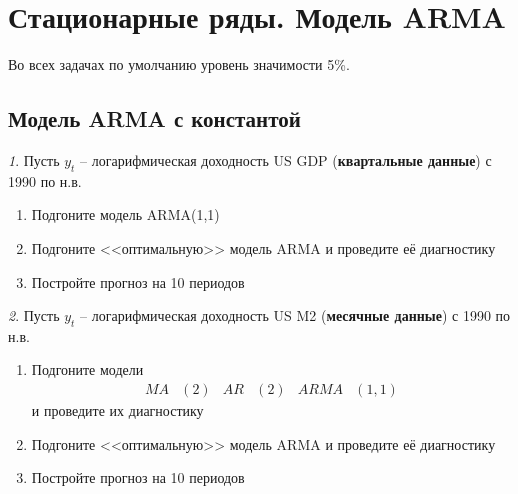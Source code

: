 \documentclass[12pt]{article}
\theoremstyle{remark}
\newtheorem{exercise}{}[subsection]
\begin{document}
\section{Стационарные ряды. Модель ARMA}

Во всех задачах по умолчанию уровень значимости 5\%.


\subsection{Модель ARMA с константой}

\begin{exercise}
Пусть \(y_t\) -- логарифмическая доходность US GDP (\textbf{квартальные данные}) с 1990 по н.в.
\begin{enumerate}
	\item Подгоните модель ARMA(1,1)
	\item Подгоните <<оптимальную>> модель ARMA и проведите её диагностику
	\item Постройте прогноз на 10 периодов
\end{enumerate}
\end{exercise}

\begin{exercise}
Пусть \(y_t\) -- логарифмическая доходность US M2 (\textbf{месячные данные}) с 1990 по н.в.
\begin{enumerate}
	\item Подгоните модели
	\begin{align*}
		MA&(2) & AR&(2) & ARMA&(1,1) 
	\end{align*} 
	и проведите их диагностику
	\item Подгоните <<оптимальную>> модель ARMA и проведите её диагностику
	\item Постройте прогноз на 10 периодов
\end{enumerate}
\end{exercise}
\end{document}
